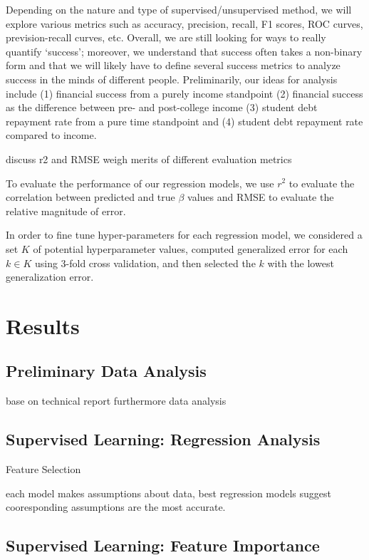 \documentclass{article} %
\begin{document}
Depending on the nature and type of supervised/unsupervised method, we will explore various metrics such as accuracy, precision, recall, F1 scores, ROC curves, prevision-recall curves, etc. Overall, we are still looking for ways to really quantify `success'; moreover, we understand that success often takes a non-binary form and that we will likely have to define several success metrics to analyze success in the minds of different people. Preliminarily, our ideas for analysis include (1) financial success from a purely income standpoint (2) financial success as the difference between pre- and post-college income (3) student debt repayment rate from a pure time standpoint and (4) student debt repayment rate compared to income. 

	discuss r2 and RMSE
	weigh merits of different evaluation metrics

To evaluate the performance of our regression models, we use $r^2$ to evaluate the correlation between predicted and true $\beta$ values and RMSE to evaluate the relative magnitude of error.

    In order to fine tune hyper-parameters for each regression model, we considered a set $K$ of potential hyperparameter values, computed generalized error for each $k \in K$ using 3-fold cross validation, and then selected the $k$ with the lowest generalization error.  
    
\section{Results}

\subsection{Preliminary Data Analysis}
	base on technical report
	furthermore data analysis

\subsection{Supervised Learning: Regression Analysis}
	Feature Selection
	
	each model makes assumptions about data, best regression models suggest cooresponding assumptions are the most accurate.
	
\subsection{Supervised Learning: Feature Importance}
\end{document}
